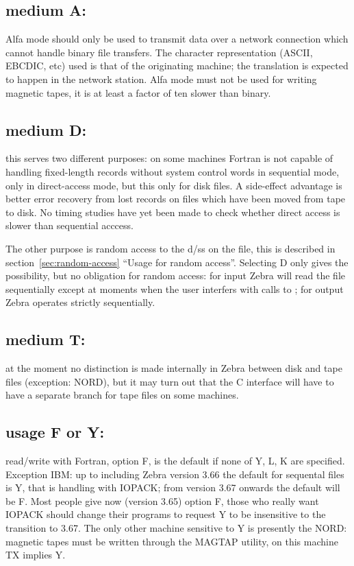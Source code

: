\subsection*{medium A:}

Alfa mode should only be used to transmit data over a network
connection which cannot handle binary file transfers.
The character representation (ASCII, EBCDIC, etc) used
is that of the originating machine;
the translation is expected to happen in the network station.
Alfa mode must not be used for writing magnetic tapes,
it is at least a factor of ten slower than binary.

\subsection*{medium D:}

this serves two different purposes:
on some machines Fortran is not capable of handling
fixed-length records without system control words in sequential mode,
only in direct-access mode, but this only for disk files.
A side-effect advantage is better error recovery from lost records
on files which have been moved from tape to disk.
No timing studies have yet been made to check whether direct access
is slower than sequential acccess.

The other purpose is random access to the d/ss on the file,
this is described in section~\ref{sec:random-access} 
``Usage for random access''.
Selecting D only gives the possibility, but no obligation for
random access: for input Zebra will read the file sequentially
except at moments when the user interfers with calls to ;
for output Zebra operates strictly sequentially.

\subsection*{medium T:}

at the moment no distinction is made internally in Zebra between
disk and tape files (exception: NORD),
but it may turn out that the C interface will have to have
a separate branch for tape files on some machines.

\subsection*{usage F or Y:}

read/write with Fortran, option F, is the default if none of Y, L, K
are specified.
Exception IBM: up to including Zebra version 3.66 the default
for sequental files is Y, that is handling with IOPACK;
from version 3.67 onwards the default will be F.
Most people give now (version 3.65) option F,
those who really want IOPACK should change their programs to
request Y to be insensitive to the transition to 3.67.
The only other machine sensitive to Y is presently the NORD:
magnetic tapes must be written through the MAGTAP utility,
on this machine TX implies Y.

